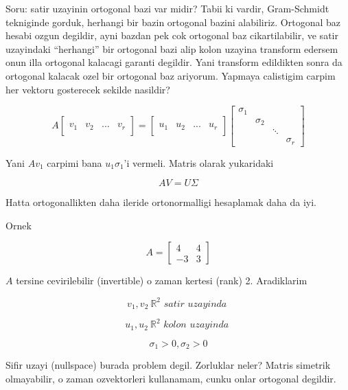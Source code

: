 \documentclass[12pt,fleqn]{article}\usepackage{../common}
\begin{document}
Soru: satir uzayinin ortogonal bazi var midir? Tabii ki vardir,
Gram-Schmidt tekniginde gorduk, herhangi bir bazin ortogonal bazini
alabiliriz. Ortogonal baz hesabi ozgun degildir, ayni bazdan pek cok
ortogonal baz cikartilabilir, ve satir uzayindaki ``herhangi'' bir
ortogonal bazi alip kolon uzayina transform edersem onun illa ortogonal
kalacagi garanti degildir. Yani transform edildikten sonra da ortogonal
kalacak ozel bir ortogonal baz ariyorum. Yapmaya calistigim carpim her
vektoru gosterecek sekilde nasildir?

\[ 
A \left[\begin{array}{rrrr}
&&& \\
v_1 & v_2& ... & v_r \\
&&& 
\end{array}\right] = 
\left[\begin{array}{rrrr}
&&& \\
u_1 & u_2& ... & u_r \\
&&& 
\end{array}\right] 
\left[\begin{array}{rrrr}
\sigma_1 &&& \\
 & \sigma_2&  & \\
&& \ddots & \\
&&& \sigma_r
\end{array}\right] 
 \]

Yani $Av_1$ carpimi bana $u_1 \sigma_1$'i vermeli. Matris olarak yukaridaki 

\[ AV = U\Sigma \]

Hatta ortogonallikten daha ileride ortonormalligi hesaplamak daha da iyi. 

Ornek 

\[ 
A = 
\left[\begin{array}{rr}
4 & 4 \\ -3 & 3
\end{array}\right]
 \]

$A$ tersine cevirilebilir (invertible) o zaman kertesi (rank)
2. Aradiklarim 

\[ v_1,v_2 \  \mathbb{R}^2 \textit{ satir uzayinda }  \]

\[ u_1,u_2 \  \mathbb{R}^2 \textit{ kolon uzayinda }  \]

\[ \sigma_1 > 0, \sigma_2 > 0 \]

Sifir uzayi (nullspace) burada problem degil. Zorluklar neler? Matris
simetrik olmayabilir, o zaman ozvektorleri kullanamam, cunku onlar
ortogonal degildir.
\end{document}
